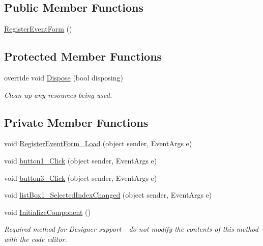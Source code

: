 \subsection*{Public Member Functions}
\begin{DoxyCompactItemize}
\item 
\hyperlink{classPCO_1_1RegisterEventForm_a77be25b0290ec0a8668858a62d1ed64a}{Register\+Event\+Form} ()
\end{DoxyCompactItemize}
\subsection*{Protected Member Functions}
\begin{DoxyCompactItemize}
\item 
override void \hyperlink{classPCO_1_1RegisterEventForm_ab275145dffd94e2613acb7c4368242c3}{Dispose} (bool disposing)
\begin{DoxyCompactList}\small\item\em Clean up any resources being used. \end{DoxyCompactList}\end{DoxyCompactItemize}
\subsection*{Private Member Functions}
\begin{DoxyCompactItemize}
\item 
void \hyperlink{classPCO_1_1RegisterEventForm_ac7ab2f047ffe3ca9564c759819cb0b77}{Register\+Event\+Form\+\_\+\+Load} (object sender, Event\+Args e)
\item 
void \hyperlink{classPCO_1_1RegisterEventForm_aa5e2b50c1d732fdc0268912b789b94d0}{button1\+\_\+\+Click} (object sender, Event\+Args e)
\item 
void \hyperlink{classPCO_1_1RegisterEventForm_a54bf47c9d0a7961847ce56ce534b8c7b}{button3\+\_\+\+Click} (object sender, Event\+Args e)
\item 
void \hyperlink{classPCO_1_1RegisterEventForm_a8746a2d2cddf34bda5367b7df5ca58ca}{list\+Box1\+\_\+\+Selected\+Index\+Changed} (object sender, Event\+Args e)
\item 
void \hyperlink{classPCO_1_1RegisterEventForm_a38a931585bbd31d0f4535a03d30b7b87}{Initialize\+Component} ()
\begin{DoxyCompactList}\small\item\em Required method for Designer support -\/ do not modify the contents of this method with the code editor. \end{DoxyCompactList}\end{DoxyCompactItemize}
